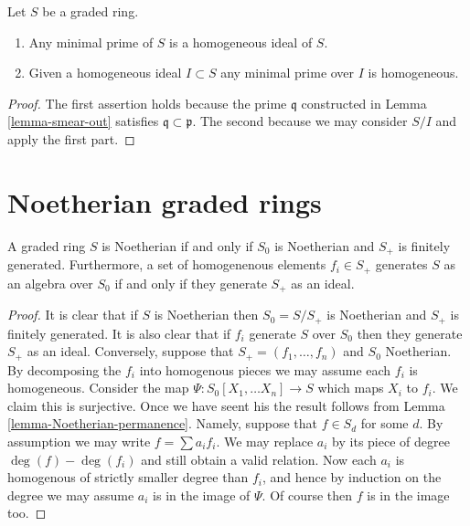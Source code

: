 \begin{lemma}
\label{lemma-graded-ring-minimal-prime}
Let $S$ be a graded ring.
\begin{enumerate}
\item Any minimal prime of $S$ is a homogeneous ideal of $S$.
\item Given a homogeneous ideal $I \subset S$ any minimal
prime over $I$ is homogeneous.
\end{enumerate}
\end{lemma}

\begin{proof}
The first assertion holds because the prime $\mathfrak q$ constructed in
Lemma \ref{lemma-smear-out} satisfies $\mathfrak q \subset \mathfrak p$.
The second because we may consider $S/I$ and apply the first part.
\end{proof}











\section{Noetherian graded rings}
\label{section-noetherian-graded}

\begin{lemma}
\label{lemma-graded-Noetherian}
A graded ring $S$ is Noetherian if and only if $S_0$ is
Noetherian and $S_{+}$ is finitely generated. Furthermore,
a set of homogenenous elements $f_i \in S_{+}$ generates $S$
as an algebra over $S_0$ if and only if they generate
$S_{+}$ as an ideal.
\end{lemma}

\begin{proof}
It is clear that if $S$ is Noetherian then $S_0 = S/S_{+}$ is Noetherian
and $S_{+}$ is finitely generated. It is also clear that if
$f_i$ generate $S$ over $S_0$ then they generate $S_{+}$ as an
ideal. Conversely, suppose that
$S_{+} = (f_1, \ldots, f_n)$ and $S_0$ Noetherian.
By decomposing the $f_i$ into homogenous pieces we may assume each
$f_i$ is homogeneous. Consider the map
$\Psi : S_0[X_1, \ldots X_n] \to S$ which maps $X_i$ to $f_i$.
We claim this is surjective. Once we have seent his the result
follows from Lemma \ref{lemma-Noetherian-permanence}.
Namely, suppose that $f \in S_d$ for some $d$.
By assumption we may write $f = \sum a_i f_i$.
We may replace $a_i$ by its piece of degree $\deg(f) - \deg(f_i)$
and still obtain a valid relation. Now each $a_i$ is homogenous
of strictly smaller degree than $f_i$, and hence by induction
on the degree we may assume $a_i$ is in the image of $\Psi$.
Of course then $f$ is in the image too.
\end{proof}

